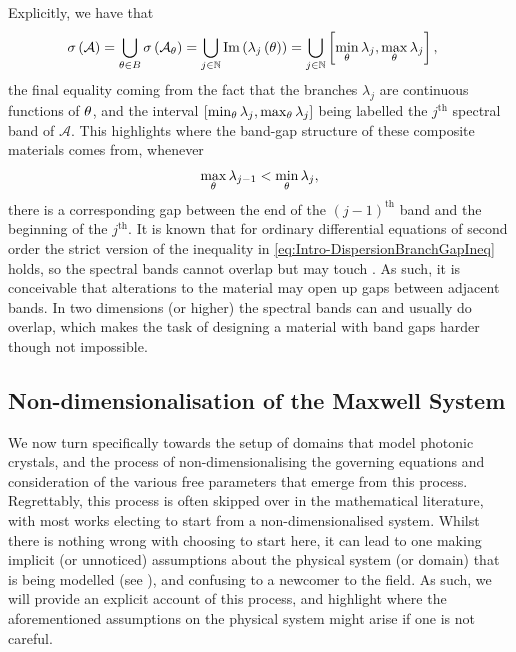 Explicitly, we have that
\begin{align*}
	\sigma\left( \mathcal{A} \right) &= \bigcup_{\theta\in B} \sigma\left( \mathcal{A}_{\theta} \right)
	= \bigcup_{j\in\mathbb{N}} \mathrm{Im}\left( \lambda_j\left( \theta \right) \right)
	= \bigcup_{j\in\mathbb{N}} \left[  \min_{\theta}\lambda_j, \max_{\theta}\lambda_j  \right],
\end{align*}
the final equality coming from the fact that the branches $\lambda_j$ are continuous functions of $\theta$, and the interval $\left[  \min_{\theta}\lambda_j, \max_{\theta}\lambda_j  \right]$ being labelled the $j^{\text{th}}$ spectral band of $\mathcal{A}$.
This highlights where the band-gap structure of these composite materials comes from, whenever 
\begin{align} \label{eq:Intro-DispersionBranchGapIneq}
	\max_{\theta}\lambda_{j-1} < \min_{\theta}\lambda_{j},
\end{align}
there is a corresponding gap between the end of the $(j-1)^{\text{th}}$ band and the beginning of the $j^{\text{th}}$.
It is known that for ordinary differential equations of second order the strict version of the inequality in \eqref{eq:Intro-DispersionBranchGapIneq} holds, so the spectral bands cannot overlap but may touch .
As such, it is conceivable that alterations to the material may open up gaps between adjacent bands.
In two dimensions (or higher) the spectral bands can and usually do overlap, which makes the task of designing a material with band gaps harder though not impossible. 

\subsection{Non-dimensionalisation of the Maxwell System} \label{ssec:Intro-NonDimMax}
We now turn specifically towards the setup of domains that model photonic crystals, and the process of non-dimensionalising the governing equations and consideration of the various free parameters that emerge from this process.
Regrettably, this process is often skipped over in the mathematical literature, with most works electing to start from a non-dimensionalised system.
Whilst there is nothing wrong with choosing to start here, it can lead to one making implicit (or unnoticed) assumptions about the physical system (or domain) that is being modelled (see ), and confusing to a newcomer to the field.
As such, we will provide an explicit account of this process, and highlight where the aforementioned assumptions on the physical system might arise if one is not careful.

